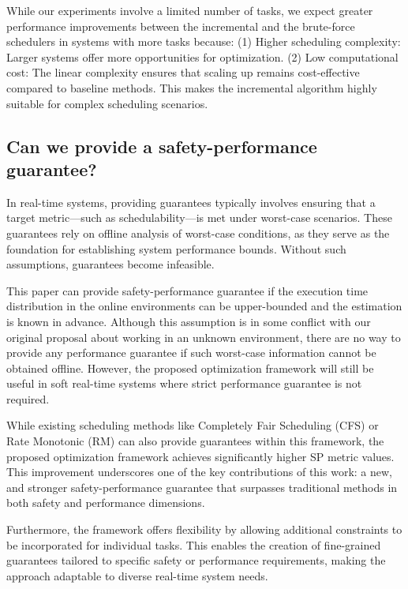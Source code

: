 While our experiments involve a limited number of tasks, we expect greater performance improvements between the incremental and the brute-force schedulers in systems with more tasks because:
(1) Higher scheduling complexity: Larger systems offer more opportunities for optimization.
(2) Low computational cost: The linear complexity ensures that scaling up remains cost-effective compared to baseline methods.
This makes the incremental algorithm highly suitable for complex scheduling scenarios.

	
    \subsection{Can we provide a safety-performance guarantee?}


    In real-time systems, providing guarantees typically involves ensuring that a target metric—such as schedulability—is met under worst-case scenarios. These guarantees rely on offline analysis of worst-case conditions, as they serve as the foundation for establishing system performance bounds. Without such assumptions, guarantees become infeasible.

    This paper can provide safety-performance guarantee if the execution time distribution in the online environments can be upper-bounded and the estimation is known in advance. 
    Although this assumption is in some conflict with our original proposal about working in an unknown environment, there are no way to provide any performance guarantee if such worst-case information cannot be obtained offline.
    However, the proposed optimization framework will still be useful in soft real-time systems where strict performance guarantee is not required.
    
    While existing scheduling methods like Completely Fair Scheduling (CFS) or Rate Monotonic (RM) can also provide guarantees within this framework, the proposed optimization framework achieves significantly higher SP metric values. This improvement underscores one of the key contributions of this work: a new, and stronger safety-performance guarantee that surpasses traditional methods in both safety and performance dimensions.

    Furthermore, the framework offers flexibility by allowing additional constraints to be incorporated for individual tasks. This enables the creation of fine-grained guarantees tailored to specific safety or performance requirements, making the approach adaptable to diverse real-time system needs.

